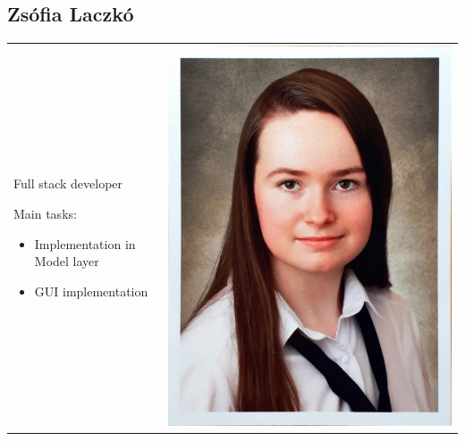 \documentclass{article}
\begin{document}
\subsection{Zsófia Laczkó}
    \begin{tabular}{@{}p{}@{} p{}@{}}
    Full stack developer
    
    Main tasks:
    \begin{itemize}
        \item Implementation in Model layer
        \item GUI implementation
    \end{itemize}
    &
    \includegraphics[width=\linewidth]{img/Zsofia_Laczko.jpg}
    \end{tabular}
\end{document}
